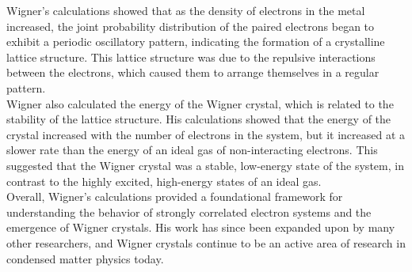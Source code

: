 Wigner's calculations showed that as the density of electrons in the metal increased, the joint probability distribution of the paired electrons began to exhibit a periodic oscillatory pattern, indicating the formation of a crystalline lattice structure. This lattice structure was due to the repulsive interactions between the electrons, which caused them to arrange themselves in a regular pattern.\\

Wigner also calculated the energy of the Wigner crystal, which is related to the stability of the lattice structure. His calculations showed that the energy of the crystal increased with the number of electrons in the system, but it increased at a slower rate than the energy of an ideal gas of non-interacting electrons. This suggested that the Wigner crystal was a stable, low-energy state of the system, in contrast to the highly excited, high-energy states of an ideal gas.\\

Overall, Wigner's calculations provided a foundational framework for understanding the behavior of strongly correlated electron systems and the emergence of Wigner crystals. His work has since been expanded upon by many other researchers, and Wigner crystals continue to be an active area of research in condensed matter physics today.

